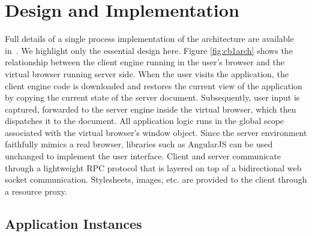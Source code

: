 \section{Design and Implementation}
\label{sec:implementation}

\architectureoverview{}

Full details of a single process implementation of the \cb architecture
are available in~\cite{mcdaniel2012cloudbrowser}.  We highlight only the
essential design here.  Figure \ref{fig:cb1arch} shows the relationship 
between the client engine running in the user's browser and the virtual browser
running server side.  When the user visits the application, the client engine
code is downloaded and restores the current view of the application by
copying the current state of the server document.  Subsequently, user input 
is captured, forwarded to the server engine inside the virtual browser, 
which then dispatches it to the document.  All application logic runs
in the global scope associated with the virtual browser's window object.
Since the server environment faithfully mimics a real browser, libraries
such as AngularJS can be used unchanged to implement the user interface.
Client and server communicate through a lightweight RPC protocol that is 
layered on top of a bidirectional web socket communication. 
Stylesheets, images, etc. are provided to the client through a resource
proxy.

\subsection{Application Instances}


\newarchitectureoverview{}

\requestdispatchdiagram{}

\appinstancefig{}



